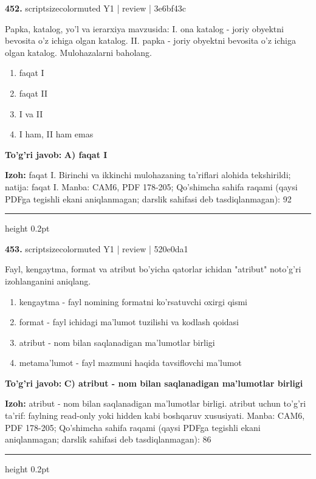 \documentclass[10pt,a4paper]{article}
\begin{document}
{\bfseries\sffamily\color{ink} 452.} {scriptsizecolor{muted} Y1 | review | 3e6bf43c}
\par
Papka, katalog, yo'l va ierarxiya mavzusida: I. ona katalog - joriy obyektni bevosita o'z ichiga olgan katalog. II. papka - joriy obyektni bevosita o'z ichiga olgan katalog. Mulohazalarni baholang.
\begin{enumerate}[label=\Alph*),leftmargin=9mm]
\item faqat I
\item faqat II
\item I va II
\item I ham, II ham emas
\end{enumerate}
\begin{tcolorbox}[enhanced,breakable,colback=teal!4,colframe=teal!60!black,boxrule=0.45pt,arc=1.2mm,left=2.7mm,right=2.7mm,top=1.8mm,bottom=1.8mm,before skip=2mm,after skip=2mm]
{\bfseries\sffamily\color{teal}To'g'ri javob:} \textbf{A) faqat I}
\par\smallskip
{\bfseries Izoh:} faqat I. Birinchi va ikkinchi mulohazaning ta'riflari alohida tekshirildi; natija: faqat I. Manba: CAM6, PDF 178-205; Qo'shimcha sahifa raqami (qaysi PDFga tegishli ekani aniqlanmagan; darslik sahifasi deb tasdiqlanmagan): 92
\end{tcolorbox}
\vspace{2mm}\hrule height 0.2pt\vspace{3mm}

{\bfseries\sffamily\color{ink} 453.} {scriptsizecolor{muted} Y1 | review | 520e0da1}
\par
Fayl, kengaytma, format va atribut bo'yicha qatorlar ichidan "atribut" noto'g'ri izohlanganini aniqlang.
\begin{enumerate}[label=\Alph*),leftmargin=9mm]
\item kengaytma - fayl nomining formatni ko'rsatuvchi oxirgi qismi
\item format - fayl ichidagi ma'lumot tuzilishi va kodlash qoidasi
\item atribut - nom bilan saqlanadigan ma'lumotlar birligi
\item metama'lumot - fayl mazmuni haqida tavsiflovchi ma'lumot
\end{enumerate}
\begin{tcolorbox}[enhanced,breakable,colback=teal!4,colframe=teal!60!black,boxrule=0.45pt,arc=1.2mm,left=2.7mm,right=2.7mm,top=1.8mm,bottom=1.8mm,before skip=2mm,after skip=2mm]
{\bfseries\sffamily\color{teal}To'g'ri javob:} \textbf{C) atribut - nom bilan saqlanadigan ma'lumotlar birligi}
\par\smallskip
{\bfseries Izoh:} atribut - nom bilan saqlanadigan ma'lumotlar birligi. atribut uchun to'g'ri ta'rif: faylning read-only yoki hidden kabi boshqaruv xususiyati. Manba: CAM6, PDF 178-205; Qo'shimcha sahifa raqami (qaysi PDFga tegishli ekani aniqlanmagan; darslik sahifasi deb tasdiqlanmagan): 86
\end{tcolorbox}
\vspace{2mm}\hrule height 0.2pt\vspace{3mm}
\end{document}
